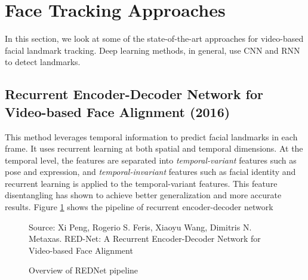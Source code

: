 \documentclass{llncs}
\begin{document}
\begin{table}[htbp]
\begin{tabular}{|l|l|l|l|l|}
\end{tabular}
\label{datasets}
\end{table}

\section{Face Tracking Approaches}

In this section, we look at some of the state-of-the-art approaches for video-based facial landmark tracking. Deep learning methods, in general, use CNN and RNN to detect landmarks.
\subsection{Recurrent Encoder-Decoder Network for Video-based Face Alignment (2016) \cite{rednet}}

This method leverages temporal information to predict facial landmarks in each frame. It uses recurrent learning at both spatial and temporal dimensions. At the temporal level, the features are separated into \textit{temporal-variant} features such as pose and expression, and \textit{temporal-invariant} features such as facial identity and recurrent learning is applied to the temporal-variant features. This feature disentangling has shown to achieve better generalization and more accurate results. Figure \ref{rednet_architecture} shows the pipeline of recurrent encoder-decoder network \\

\begin{figure}
%
{Source: Xi Peng, Rogerio S. Feris, Xiaoyu Wang, Dimitris N. Metaxas. RED-Net: A Recurrent Encoder-Decoder Network for Video-based Face Alignment}
\caption{Overview of REDNet pipeline}
\label{rednet_architecture}
\end{figure}
\end{document}

